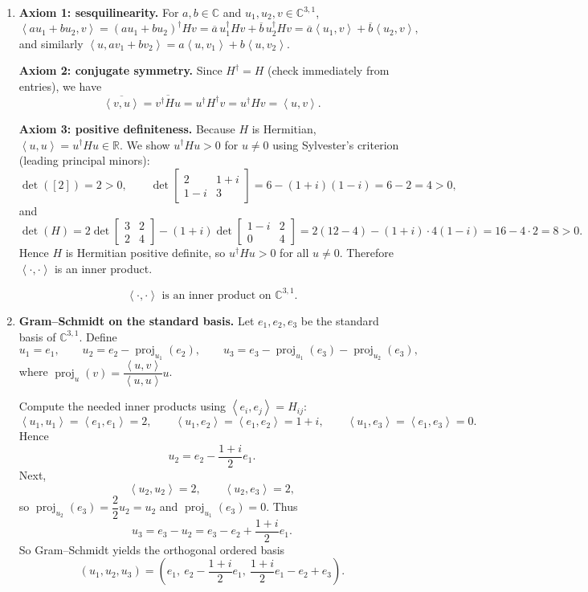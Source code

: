 \documentclass[12pt]{article}
\newcommand{\R}{\mathbb{R}}
\newcommand{\C}{\mathbb{C}}
\DeclareMathOperator{\proj}{proj}
\newcommand{\ip}[2]{\left\langle #1,#2\right\rangle}
\begin{document}
\begin{enumerate}[label=(\alph*)]
\item \textbf{Axiom 1: sesquilinearity.}
For $a,b\in\C$ and $u_1,u_2,v\in\C^{3,1}$,
\[
\ip{au_1+bu_2}{v}=(au_1+bu_2)^\dagger H v=\overline{a}\,u_1^\dagger Hv+\overline{b}\,u_2^\dagger Hv
=\overline{a}\ip{u_1}{v}+\overline{b}\ip{u_2}{v},
\]
and similarly $\ip{u}{av_1+bv_2}=a\ip{u}{v_1}+b\ip{u}{v_2}$.

\smallskip
\noindent\textbf{Axiom 2: conjugate symmetry.}
Since $H^\dagger=H$ (check immediately from entries), we have
\[
\overline{\ip{v}{u}}=\overline{v^\dagger H u}=u^\dagger H^\dagger v=u^\dagger H v=\ip{u}{v}.
\]

\smallskip
\noindent\textbf{Axiom 3: positive definiteness.}
Because $H$ is Hermitian, $\ip{u}{u}=u^\dagger H u\in\R$.
We show $u^\dagger H u>0$ for $u\neq 0$ using Sylvester's criterion (leading principal minors):
\[
\det([2])=2>0,\qquad
\det\begin{bmatrix}2&1+i\\1-i&3\end{bmatrix}
=6-(1+i)(1-i)=6-2=4>0,
\]
and
\[
\det(H)=2\det\begin{bmatrix}3&2\\2&4\end{bmatrix}-(1+i)\det\begin{bmatrix}1-i&2\\0&4\end{bmatrix}
=2(12-4)- (1+i)\cdot 4(1-i)
=16-4\cdot 2=8>0.
\]
Hence $H$ is Hermitian positive definite, so $u^\dagger H u>0$ for all $u\neq 0$.
Therefore $\ip{\cdot}{\cdot}$ is an inner product.

\[
\boxed{\,\ip{\cdot}{\cdot}\text{ is an inner product on }\C^{3,1}. \,}
\]

\item \textbf{Gram--Schmidt on the standard basis.}
Let $e_1,e_2,e_3$ be the standard basis of $\C^{3,1}$.
Define
\[
u_1=e_1,\qquad
u_2=e_2-\proj_{u_1}(e_2),\qquad
u_3=e_3-\proj_{u_1}(e_3)-\proj_{u_2}(e_3),
\]
where $\proj_{u}(v)=\dfrac{\ip{u}{v}}{\ip{u}{u}}u$.

Compute the needed inner products using $\ip{e_i}{e_j}=H_{ij}$:
\[
\ip{u_1}{u_1}=\ip{e_1}{e_1}=2,\qquad
\ip{u_1}{e_2}=\ip{e_1}{e_2}=1+i,\qquad
\ip{u_1}{e_3}=\ip{e_1}{e_3}=0.
\]
Hence
\[
u_2=e_2-\frac{1+i}{2}e_1.
\]
Next,
\[
\ip{u_2}{u_2}=2,
\qquad
\ip{u_2}{e_3}=2,
\]
so $\proj_{u_2}(e_3)=\dfrac{2}{2}u_2=u_2$ and $\proj_{u_1}(e_3)=0$.
Thus
\[
u_3=e_3-u_2=e_3-e_2+\frac{1+i}{2}e_1.
\]
So Gram--Schmidt yields the orthogonal ordered basis
\[
\boxed{\,
(u_1,u_2,u_3)=\left(e_1,\ e_2-\frac{1+i}{2}e_1,\ \frac{1+i}{2}e_1-e_2+e_3\right).
\,}
\]


\end{enumerate}
\end{document}

